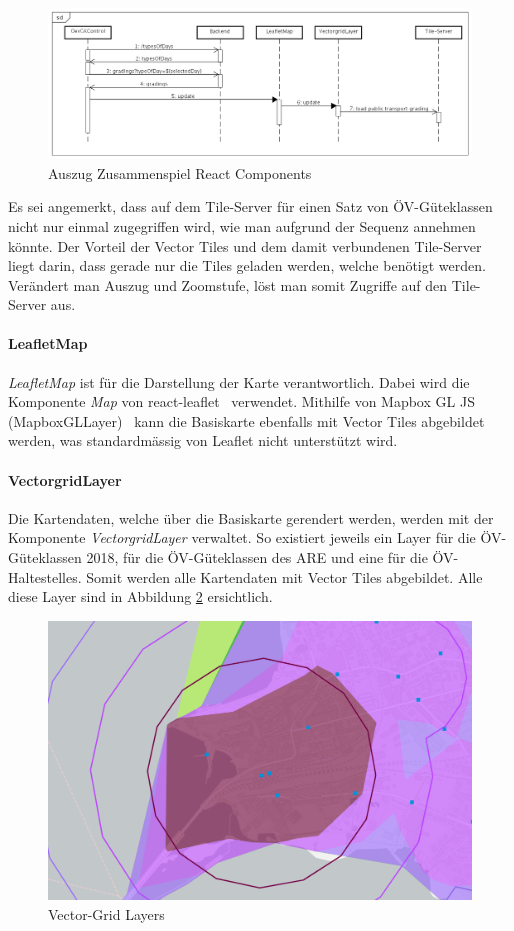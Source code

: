 \begin{figure}[ht]
    \centering
    \includegraphics[width=1.0\linewidth]{projectdoc/img/Web-App_Sequence.png}
    \caption[Auszug Zusammenspiel React Components]{Auszug Zusammenspiel React Components}
    \label{fig:Web-App_Sequence}
\end{figure}

Es sei angemerkt, dass auf dem Tile-Server für einen Satz von \gls{ÖV-Güteklassen} nicht nur einmal zugegriffen wird, wie man aufgrund der Sequenz annehmen könnte.
Der Vorteil der Vector Tiles und dem damit verbundenen Tile-Server liegt darin, dass gerade nur die Tiles geladen werden, welche benötigt werden. Verändert man Auszug und Zoomstufe, löst man somit Zugriffe auf den Tile-Server aus.

\paragraph{LeafletMap}
\emph{LeafletMap} ist für die Darstellung der Karte verantwortlich.
Dabei wird die Komponente \emph{Map} von react-leaflet~\cite{react-leaflet} verwendet.
Mithilfe von Mapbox GL JS (MapboxGLLayer)~\cite{mapbox_gl_leaflet} kann die Basiskarte ebenfalls mit Vector Tiles abgebildet werden, was standardmässig von Leaflet nicht unterstützt wird.

\paragraph{VectorgridLayer}
Die Kartendaten, welche über die Basiskarte gerendert werden, werden mit der Komponente \emph{VectorgridLayer} verwaltet.
So existiert jeweils ein Layer für die \gls{ÖV-Güteklassen} 2018, für die \gls{ÖV-Güteklassen} des \acl{ARE} und eine für die ÖV-\glspl{Haltestelle}.
Somit werden alle Kartendaten mit Vector Tiles abgebildet.
Alle diese Layer sind in Abbildung \ref{fig:Vector-Grid-Layers} ersichtlich.

\begin{figure}[ht]
    \centering
    \includegraphics[width=0.6\linewidth]{projectdoc/img/vectorgrid_layers.png}
    \caption[Vector-Grid Layers]{Vector-Grid Layers}
    \label{fig:Vector-Grid-Layers}
\end{figure}

